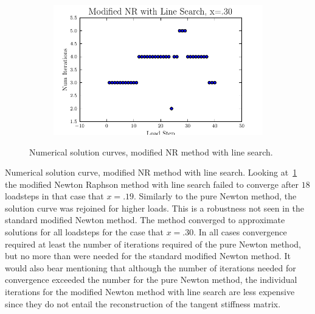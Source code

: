 \documentclass[10pt,letterpaper]{article}
\begin{document}
\begin{figure}[!tbh]
\begin{subfigure}[b]{.6\textwidth}
    \caption{}
    \label{fig4:label:c}
  \end{subfigure}
  \hfill
  \begin{subfigure}[b]{.6\textwidth}
    \includegraphics[width=\textwidth]{moded_nr_wls_x30_conv.pdf}
    \caption{}
    \label{fig4:label:d}
  \end{subfigure}
    \caption{Numerical solution curves, modified NR method with line search.}
\end{figure}

Numerical solution curve, modified NR method with line search. Looking at~\ref{fig4:label:c} the modified Newton Raphson method with line search failed to converge after $18$ loadsteps in that case that $x=.19$. Similarly to the pure Newton method, the solution curve was rejoined for higher loads. This is a robustness not seen in the standard modified Newton method. The method converged to approximate solutions for all loadsteps for the case that $x=.30$. In all cases convergence required at least the number of iterations required of the pure Newton method, but no more than were needed for the standard modified Newton method. It would also bear mentioning that although the number of iterations needed for convergence exceeded the number for the pure Newton method, the individual iterations for the modified Newton method with line search are less expensive since they do not entail the reconstruction of the tangent stiffness matrix.
\end{document}
